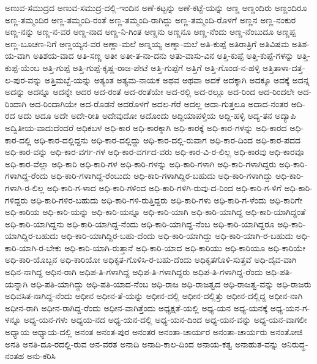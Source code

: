{ಅಣುವ-ಸಮುದ್ರದ
ಅಣುವ-ಸಮುದ್ರ-ದಲ್ಲಿ-ಇಂದಿನ
ಅಣೆ-ಕಟ್ಟನ್ನು
ಅಣೆ-ಕಟ್ಟೆ-ಯನ್ನು
ಅಣ್ಣ
ಅಣ್ಣಂದಿರು
ಅಣ್ಣಂದಿರೂ
ಅಣ್ಣ-ತಮ್ಮಂದಿರ
ಅಣ್ಣ-ತಮ್ಮಂದಿ-ರಂತೆ
ಅಣ್ಣ-ತಮ್ಮಂದಿ-ರಾಗಿದ್ದು
ಅಣ್ಣ-ತಮ್ಮಂದಿ-ರೊಳಗೆ
ಅಣ್ಣನ
ಅಣ್ಣ-ನಂಕುರ
ಅಣ್ಣ-ನನ್ನು
ಅಣ್ಣ-ನ-ವರ
ಅಣ್ಣ-ನಾದ
ಅಣ್ಣ-ನಿ-ಗಿಂತ
ಅಣ್ಣನು
ಅಣ್ಣನೂ
ಅಣ್ಣ-ನೆಂದು
ಅಣ್ಣ-ನೆಂಬುದೂ
ಅಣ್ಣಪ್ಪ
ಅಣ್ಣ-ಬೂಚಣ-ನಿಗೆ
ಅಣ್ಣಯ್ಯನ-ವರ
ಅಣ್ಣಾ-ಮಲೆ
ಅಣ್ನಯ್ಯ
ಅಣ್ನಾ-ಮಲೆ
ಅತಿ-ಕುಪ್ಪೆ
ಅತಿರಾತ್ರಿಗೆ
ಅತಿವಿಷಮ
ಅತಿಶ-ಯ-ವಾಗಿ
ಅತಿಶಯ-ವಾದ
ಅತಿ-ಸಣ್ಣ
ಅತೀ
ಅತೀ-ತ-ನಾ-ದನು
ಅತು-ವಾಸು-ವಿನ
ಅತ್ತಿ-ಕುಪ್ಪೆ
ಅತ್ತಿ-ಕುಪ್ಪೆ-ಗಳನ್ನು
ಅತ್ತಿ-ಕುಪ್ಪೆ-ಯೆಂಬ
ಅತ್ತಿ-ಗುಪ್ಪೆ
ಅತ್ತಿ-ಗುಪ್ಪೆ-ಕೃಷ್ಣ-ರಾಜ-ಪೇಟೆ
ಅತ್ತಿ-ಗುಪ್ಪೆಗೆ
ಅತ್ತಿಗೆ
ಅತ್ತಿ-ಗೊಂಡ-ನ-ಹಳ್ಳಿ
ಅತ್ತಿತಾಳಾ-ದತ್ತ-ಲ-ಪುರ-ವನ್ನು
ಅತ್ತಿಮಬ್ಬೆ-ಯನ್ನು
ಅತ್ಯಂತ
ಅತ್ಯಮ-ನಾಯಕ
ಅಥವ
ಅಥವಾ
ಅದಕೆ
ಅದಕ್ಕಾಗಿ
ಅದಕ್ಕೂ
ಅದಕ್ಕೆ
ಅದನ್ನ
ಅದನ್ನು
ಅದನ್ನೂ
ಅದನ್ನೇ
ಅದರ
ಅದ-ರಂತೆ
ಅದ-ರಂತೆಯೇ
ಅದ-ರಲ್ಲಿ
ಅದ-ರಲ್ಲೂ
ಅದ-ರಿಂದ
ಅದ-ರಿಂದಲೇ
ಅದ-ರಿಂದಾಗಿ
ಅದ-ರಿಂದಾಗಿಯೇ
ಅದ-ರೊಡನೆ
ಅದರೊಳಗೆ
ಅದಲ-ಗೆರೆ
ಅದಲ್ಲ
ಅದಾ-ಗುತ್ತಲೂ
ಅದಾದ-ನಂತರ
ಅದಿ-ರದ
ಅದು
ಅದೂ
ಅದೇ
ಅದೇ-ರೀತಿ
ಅದೇವುದೋ
ಅದೊಂದು
ಅದ್ದಿಯಾಪಳ್ತಿಯ
ಅದ್ದಿ-ಹಳ್ಳಿ
ಅದ್ಯ-ತನ
ಅದ್ಯಾಪಿ
ಅದ್ವಿತೀಯ-ವಾದುದೆಂದರೆ
ಅಧಿಕಬಳ
ಅಧಿ-ಕಾರ
ಅಧಿ-ಕಾರಕ್ಕಾಗಿ
ಅಧಿ-ಕಾರಕ್ಕೆ
ಅಧಿ-ಕಾರ-ಗಳನ್ನು
ಅಧಿ-ಕಾರದ
ಅಧಿ-ಕಾರ-ದಲ್ಲಿ
ಅಧಿ-ಕಾರ-ದಲ್ಲಿದ್ದನು
ಅಧಿ-ಕಾರ-ದಲ್ಲಿದ್ದು
ಅಧಿ-ಕಾರ-ದಲ್ಲಿ-ರುವಾಗ
ಅಧಿ-ಕಾರ-ದಿಂದ
ಅಧಿ-ಕಾರ-ಪದದ
ಅಧಿ-ಕಾರ-ವನ್ನು
ಅಧಿ-ಕಾರ-ವರ್ಗ-ಗಳ
ಅಧಿ-ಕಾರ-ವರ್ಗದ-ವರು
ಅಧಿ-ಕಾರ-ವಿ-ರ-ಲಿಲ್ಲ
ಅಧಿ-ಕಾರವು
ಅಧಿ-ಕಾರವೂ
ಅಧಿ-ಕಾರ-ವೆಲ್ಲಾ
ಅಧಿ-ಕಾರಿ
ಅಧಿ-ಕಾರಿ-ಗಳ
ಅಧಿ-ಕಾರಿ-ಗಳನ್ನು
ಅಧಿ-ಕಾರಿ-ಗಳಾಗಿ
ಅಧಿ-ಕಾರಿ-ಗಳಾಗಿದ್ದರು
ಅಧಿ-ಕಾರಿ-ಗಳಾಗಿದ್ದ-ರೆಂದು
ಅಧಿ-ಕಾರಿ-ಗಳಾಗಿದ್ದ-ರೆಂಬುದು
ಅಧಿ-ಕಾರಿ-ಗಳಾಗಿದ್ದಿರ-ಬಹುದು
ಅಧಿ-ಕಾರಿ-ಗಳಾಗಿದ್ದು
ಅಧಿ-ಕಾರಿ-ಗಳಾಗಿ-ರ-ಲಿಲ್ಲ
ಅಧಿ-ಕಾರಿ-ಗ-ಳಾದ
ಅಧಿ-ಕಾರಿ-ಗಳಿಂದ
ಅಧಿ-ಕಾರಿ-ಗಳಿಗಿ-ರುವು-ದ-ರಿಂದ
ಅಧಿ-ಕಾರಿ-ಗ-ಳಿಗೆ
ಅಧಿ-ಕಾರಿ-ಗಳಿದ್ದರು
ಅಧಿ-ಕಾರಿ-ಗಳಿರ-ಬಹುದು
ಅಧಿ-ಕಾರಿ-ಗಳಿ-ರುತ್ತಿದ್ದರು
ಅಧಿ-ಕಾರಿ-ಗಳು
ಅಧಿ-ಕಾರಿ-ಗ-ಳೆಂದು
ಅಧಿ-ಕಾರಿಗೇ
ಅಧಿ-ಕಾರಿಯ
ಅಧಿ-ಕಾರಿ-ಯನ್ನು
ಅಧಿ-ಕಾರಿ-ಯನ್ನೂ
ಅಧಿ-ಕಾರಿ-ಯಾಗಿ
ಅಧಿ-ಕಾರಿ-ಯಾಗಿದ್ದ
ಅಧಿ-ಕಾರಿ-ಯಾಗಿದ್ದಂತೆ
ಅಧಿ-ಕಾರಿ-ಯಾಗಿದ್ದನು
ಅಧಿ-ಕಾರಿ-ಯಾಗಿದ್ದ-ನೆಂದು
ಅಧಿ-ಕಾರಿ-ಯಾಗಿದ್ದ-ನೆಂಬ
ಅಧಿ-ಕಾರಿ-ಯಾಗಿದ್ದರೂ
ಅಧಿ-ಕಾರಿ-ಯಾಗಿದ್ದಿರ-ಬಹುದು
ಅಧಿ-ಕಾರಿ-ಯಾಗಿದ್ದಿರ-ಬಹು-ದೆಂದು
ಅಧಿ-ಕಾರಿ-ಯಾಗಿದ್ದು
ಅಧಿ-ಕಾರಿ-ಯಾಗಿ-ರ-ಬಹುದು
ಅಧಿ-ಕಾರಿ-ಯಾಗಿ-ರ-ಬೇಕು
ಅಧಿ-ಕಾರಿ-ಯಾಗಿ-ರುತ್ತಾನೆ
ಅಧಿ-ಕಾರಿ-ಯಾದ
ಅಧಿ-ಕಾರಿಯು
ಅಧಿ-ಕಾರಿಯೂ
ಅಧಿ-ಕಾರಿಯೇ
ಅಧಿ-ಕಾರಿ-ಯೊಬ್ಬನ
ಅಧಿ-ಕಾರಿಯೋ
ಅಧಿಕೃತ-ಗೊಳಿಸಿ-ರ-ಬಹು-ದೆಂದು
ಅಧಿಕೃತಗೊಳಿ-ಸುತ್ತವೆ
ಅಧಿ-ದೈವ-ವಾಗಿ
ಅಧಿನ-ನಾಗಿದ್ದ
ಅಧಿನ-ರಾಗಿ
ಅಧಿಪ-ತಿ-ಗಳಾಗಿದ್ದ
ಅಧಿಪ-ತಿ-ಗಳಾಗಿದ್ದರು
ಅಧಿಪ-ತಿ-ಗಳಾಗಿದ್ದ-ರೆಂದು
ಅಧಿ-ಪತಿ-ಯನ್ನಾಗಿ
ಅಧಿ-ಪತಿ-ಯಾಗಿದ್ದು
ಅಧಿ-ಪತಿ-ಯಾದ-ನೆಂಬ
ಅಧಿ-ರಾಜ
ಅಧಿ-ರಾಜತ್ವದ
ಅಧಿ-ರಾಜತ್ವ-ವನ್ನು
ಅಧಿ-ರಾಜರು
ಅಧಿವಸಿತ-ನಾಗಿದ್ದ-ನೆಂದು
ಅಧೀನ
ಅಧೀನ-ತೆ-ಯನ್ನು
ಅಧೀನ-ದಲ್ಲಿ
ಅಧೀನ-ದಲ್ಲಿತ್ತು
ಅಧೀನ-ದಲ್ಲಿದ್ದ
ಅಧೀನ-ನಾಗಿ
ಅಧೀನ-ರಾಗಿ
ಅಧೀನ-ರಾಗಿದ್ದ-ರೆಂದು
ಅಧೀನ-ವಾಗಿತ್ತೆಂದು
ಅಧ್ಯಕ್ಷತೆ-ಯಲ್ಲಿ
ಅಧ್ಯ-ಯನ
ಅಧ್ಯ-ಯನಕ್ಕೆ
ಅಧ್ಯ-ಯನ-ಗ-ಳನ್ನೂ
ಅಧ್ಯ-ಯನ-ಗಳು
ಅಧ್ಯಯ-ನದ
ಅಧ್ಯ-ಯನ-ದಲ್ಲಿ
ಅಧ್ಯ-ಯನ-ದಿಂದ
ಅಧ್ಯ-ಯನ-ವನ್ನು
ಅಧ್ಯ-ಯನ-ವಾಗಲೀ
ಅಧ್ಯಾಯ
ಅಧ್ಯಾಯ-ದಲ್ಲಿ
ಅನಂತ
ಅನಂತ-ಪುರ
ಅನಂತರ
ಅನಂತಾ-ಚಾರ್ಯರ
ಅನಂತಾ-ಚಾರ್ಯರು
ಅನಂತೋಜಿ
ಅನತಿ
ಅನತಿ-ದೂ-ರದಲ್ಲಿ-ರುವ
ಅನ-ವರತ
ಅನಾದಿ
ಅನಾದಿ-ಕಾಲ-ದಿಂದ
ಅನಾಯ-ಕತ್ವ
ಅನಾಹುತ-ವನ್ನು
ಅನಿರುದ್ಧ-ನಂತಹ
ಅನು-ಕರಿಸಿ
}
